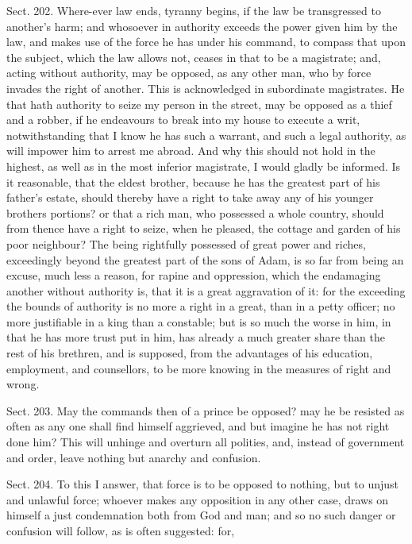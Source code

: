 \documentclass[11pt,openany]{book}
\begin{document}
Sect. 202. Where-ever law ends, tyranny begins, if the law be transgressed to another's harm; and whosoever in authority exceeds the power given him by the law, and makes use of the force he has under his command, to compass that upon the subject, which the law allows not, ceases in that to be a magistrate; and, acting without authority, may be opposed, as any other man, who by force invades the right of another. This is acknowledged in subordinate magistrates. He that hath authority to seize my person in the street, may be opposed as a thief and a robber, if he endeavours to break into my house to execute a writ, notwithstanding that I know he has such a warrant, and such a legal authority, as will impower him to arrest me abroad. And why this should not hold in the highest, as well as in the most inferior magistrate, I would gladly be informed. Is it reasonable, that the eldest brother, because he has the greatest part of his father's estate, should thereby have a right to take away any of his younger brothers portions? or that a rich man, who possessed a whole country, should from thence have a right to seize, when he pleased, the cottage and garden of his poor neighbour? The being rightfully possessed of great power and riches, exceedingly beyond the greatest part of the sons of Adam, is so far from being an excuse, much less a reason, for rapine and oppression, which the endamaging another without authority is, that it is a great aggravation of it: for the exceeding the bounds of authority is no more a right in a great, than in a petty officer; no more justifiable in a king than a constable; but is so much the worse in him, in that he has more trust put in him, has already a much greater share than the rest of his brethren, and is supposed, from the advantages of his education, employment, and counsellors, to be more knowing in the measures of right and wrong.

Sect. 203. May the commands then of a prince be opposed? may he be resisted as often as any one shall find himself aggrieved, and but imagine he has not right done him? This will unhinge and overturn all polities, and, instead of government and order, leave nothing but anarchy and confusion.

Sect. 204. To this I answer, that force is to be opposed to nothing, but to unjust and unlawful force; whoever makes any opposition in any other case, draws on himself a just condemnation both from God and man; and so no such danger or confusion will follow, as is often suggested: for,
\end{document}
